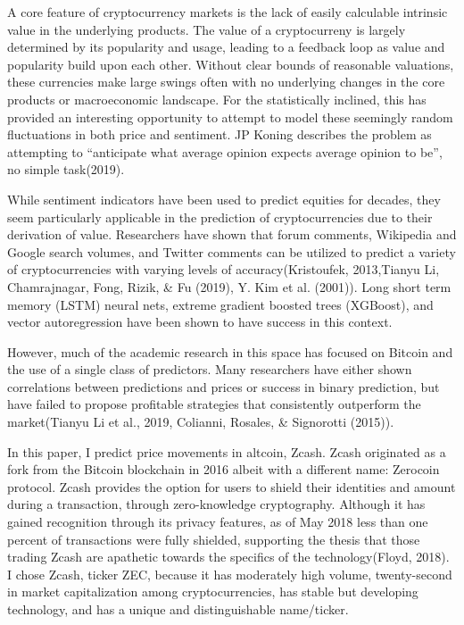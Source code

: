 \documentclass[12pt,twoside]{dukestatscithesis}
\begin{document}
A core feature of cryptocurrency markets is the lack of easily
calculable intrinsic value in the underlying products. The value of a
cryptocurreny is largely determined by its popularity and usage, leading
to a feedback loop as value and popularity build upon each other.
Without clear bounds of reasonable valuations, these currencies make
large swings often with no underlying changes in the core products or
macroeconomic landscape. For the statistically inclined, this has
provided an interesting opportunity to attempt to model these seemingly
random fluctuations in both price and sentiment. JP Koning describes the
problem as attempting to ``anticipate what average opinion expects
average opinion to be'', no simple task(2019).

While sentiment indicators have been used to predict equities for
decades, they seem particularly applicable in the prediction of
cryptocurrencies due to their derivation of value. Researchers have
shown that forum comments, Wikipedia and Google search volumes, and
Twitter comments can be utilized to predict a variety of
cryptocurrencies with varying levels of accuracy(Kristoufek, 2013,Tianyu
Li, Chamrajnagar, Fong, Rizik, \& Fu (2019), Y. Kim et al. (2001)). Long
short term memory (LSTM) neural nets, extreme gradient boosted trees
(XGBoost), and vector autoregression have been shown to have success in
this context.

However, much of the academic research in this space has focused on
Bitcoin and the use of a single class of predictors. Many researchers
have either shown correlations between predictions and prices or success
in binary prediction, but have failed to propose profitable strategies
that consistently outperform the market(Tianyu Li et al., 2019,
Colianni, Rosales, \& Signorotti (2015)).

In this paper, I predict price movements in altcoin, Zcash. Zcash
originated as a fork from the Bitcoin blockchain in 2016 albeit with a
different name: Zerocoin protocol. Zcash provides the option for users
to shield their identities and amount during a transaction, through
zero-knowledge cryptography. Although it has gained recognition through
its privacy features, as of May 2018 less than one percent of
transactions were fully shielded, supporting the thesis that those
trading Zcash are apathetic towards the specifics of the
technology(Floyd, 2018). I chose Zcash, ticker ZEC, because it has
moderately high volume, twenty-second in market capitalization among
cryptocurrencies, has stable but developing technology, and has a unique
and distinguishable name/ticker.
\end{document}
